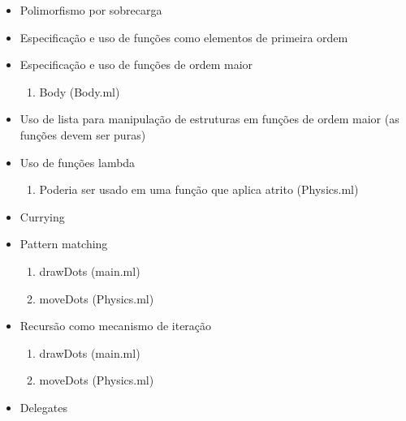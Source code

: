 \documentclass[a4paper,10pt]{article}
\begin{document}
\begin{itemize}
 \item Polimorfismo por sobrecarga
 \item Especificação e uso de funções como elementos de primeira ordem
 \item Especificação e uso de funções de ordem maior
 {\color{notDone}
		\begin{enumerate}
			\item Body (Body.ml)
		\end{enumerate}
		}
 \item Uso de lista para manipulação de estruturas em funções de ordem maior (as funções devem ser puras)
 \item Uso de funções lambda
		{\color{notDone}
		\begin{enumerate}
			\item Poderia ser usado em uma função que aplica atrito (Physics.ml)
		\end{enumerate}
		}
 \item Currying
 \item Pattern matching
		{\color{done}
		\begin{enumerate}
			\item drawDots (main.ml)
			\item moveDots (Physics.ml)
		\end{enumerate}
		}
 \item Recursão como mecanismo de iteração
		{\color{done}
		\begin{enumerate}
			\item drawDots (main.ml)
			\item moveDots (Physics.ml)
		\end{enumerate}
		}
 \item Delegates


\end{itemize}
\end{document}
